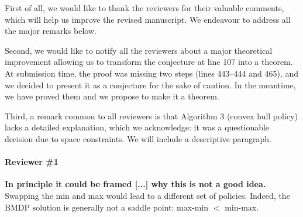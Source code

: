 \documentclass{article}
\begin{document}

First of all, we would like to thank the reviewers for their valuable comments, which will help us improve the revised manuscript. We endeavour to address all the major remarks below.

Second, we would like to notify all the reviewers about a major theoretical improvement allowing us to transform the conjecture at line 107 into a theorem. At submission time, the proof was missing two steps (lines 443--444 and 465), and we decided to present it as a conjecture for the sake of caution. In the meantime, we have proved them and we propose to make it a theorem.

Third, a remark common to all reviewers is that Algorithm 3 (convex hull policy) lacks a detailed explanation, which we acknowledge: it was a questionable decision due to space constraints. We will include a descriptive paragraph.


\paragraph{\large Reviewer \#1}



\textbf{In principle it could be framed [...] why this is not a good idea.}
Swapping the min and max would lead to a different set of policies. Indeed,  the BMDP solution is generally not a saddle point: max-min $<$ min-max. %
\end{document}
